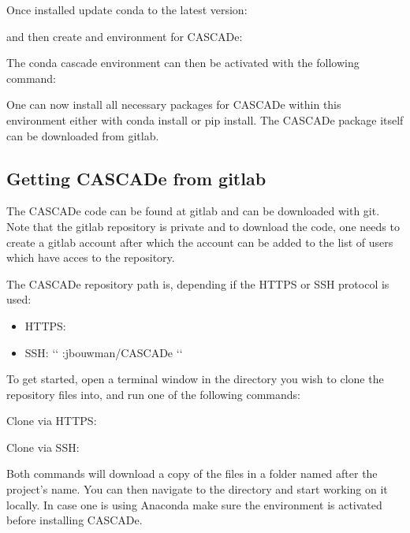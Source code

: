 \documentclass[a4paper,10pt,english]{sphinxmanual}
\begin{document}
Once installed update conda to the latest version:


and then create and environment for CASCADe:


The conda cascade environment can then be activated with the following command:


One can now install all necessary packages for CASCADe within this environment either with conda install or
pip install. The CASCADe package itself can be downloaded from gitlab.


\subsection{Getting CASCADe from gitlab}
\label{\detokenize{install:getting-cascade-from-gitlab}}
The CASCADe code can be found at gitlab and can be downloaded with git. Note that the gitlab repository
is private and to download the code, one needs to create a gitlab account after which the account can be
added to the list of users which have acces to the repository.

The CASCADe repository path is, depending if the HTTPS or SSH protocol is used:
\begin{itemize}
\item {} 
HTTPS: 

\item {} 
SSH: {}`{}` :jbouwman/CASCADe {}`{}`

\end{itemize}

To get started, open a terminal window in the directory
you wish to clone the repository files into, and run one
of the following commands:

Clone via HTTPS:


Clone via SSH:


Both commands will download a copy of the files in a
folder named after the project’s name. You can then navigate to the directory and start working
on it locally. In case one is using Anaconda make sure the environment is activated before installing CASCADe.
\end{document}
